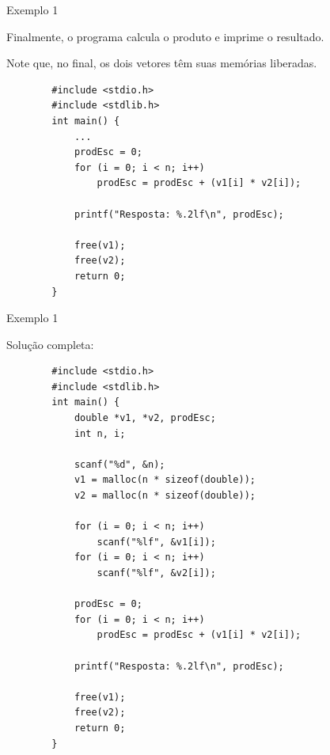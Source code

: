 \documentclass[handout]{beamer}
\begin{document}
\begin{frame}[fragile]{Exemplo 1}

    Finalmente, o programa calcula o produto e imprime o resultado.
    \vspace{-0.3cm}

    Note que, no final, os dois vetores têm suas memórias liberadas. 
    \vspace{-0.5cm}

    \begin{verbatim}
        #include <stdio.h>
        #include <stdlib.h>
        int main() {
            ...
            prodEsc = 0;
            for (i = 0; i < n; i++)
                prodEsc = prodEsc + (v1[i] * v2[i]);

            printf("Resposta: %.2lf\n", prodEsc);

            free(v1);
            free(v2);
            return 0;
        }
    \end{verbatim}

\end{frame}

\begin{frame}[fragile]{Exemplo 1}

    Solução completa:
    \vspace{-0.3cm}
    \begin{verbatim}
        #include <stdio.h>
        #include <stdlib.h>
        int main() {
            double *v1, *v2, prodEsc;
            int n, i;

            scanf("%d", &n);
            v1 = malloc(n * sizeof(double));
            v2 = malloc(n * sizeof(double));
            
            for (i = 0; i < n; i++)
                scanf("%lf", &v1[i]);
            for (i = 0; i < n; i++)
                scanf("%lf", &v2[i]);

            prodEsc = 0;
            for (i = 0; i < n; i++)
                prodEsc = prodEsc + (v1[i] * v2[i]);

            printf("Resposta: %.2lf\n", prodEsc);

            free(v1);
            free(v2);
            return 0;
        }
    \end{verbatim}

\end{frame}
\end{document}
